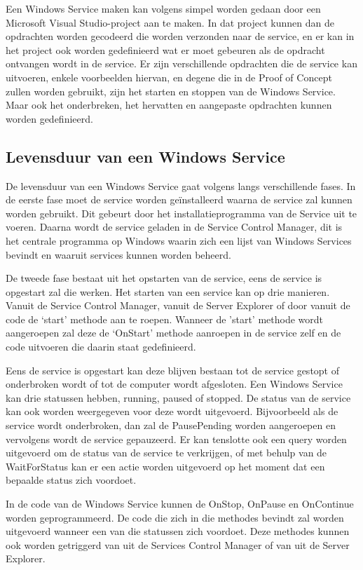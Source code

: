 Een Windows Service maken kan volgens \textcite{DevMozService} simpel worden gedaan door een Microsoft Visual Studio-project aan te maken. In dat project kunnen dan de opdrachten worden gecodeerd die worden verzonden naar de service, en er kan in het project ook worden gedefinieerd wat er moet gebeuren als de opdracht ontvangen wordt in de service. Er zijn verschillende opdrachten die de service kan uitvoeren, enkele voorbeelden hiervan, en degene die in de Proof of Concept zullen worden gebruikt, zijn het starten en stoppen van de Windows Service. Maar ook het onderbreken, het hervatten en aangepaste opdrachten kunnen worden gedefinieerd. 

\subsection{Levensduur van een Windows Service}
De levensduur van een Windows Service gaat volgens \textcite{DevMozService} langs verschillende fases. In de eerste fase moet de service worden geïnstalleerd waarna de service zal kunnen worden gebruikt. Dit gebeurt door het installatieprogramma van de Service uit te voeren. Daarna wordt de service geladen in de Service Control Manager, dit is het centrale programma op Windows waarin zich een lijst van Windows Services bevindt en waaruit services kunnen worden beheerd. 

De tweede fase bestaat uit het opstarten van de service, eens de service is opgestart zal die werken. Het starten van een service kan op drie manieren. Vanuit de Service Control Manager, vanuit de Server Explorer of door vanuit de code de ‘start’ methode aan te roepen. Wanneer de 'start’ methode wordt aangeroepen zal deze de ‘OnStart’ methode aanroepen in de service zelf en de code uitvoeren die daarin staat gedefinieerd. 

Eens de service is opgestart kan deze blijven bestaan tot de service gestopt of onderbroken wordt of tot de computer wordt afgesloten. Een Windows Service kan drie statussen hebben, running, paused of stopped. De status van de service kan ook worden weergegeven voor deze wordt uitgevoerd. Bijvoorbeeld als de service wordt onderbroken, dan zal de PausePending worden aangeroepen en vervolgens wordt de service gepauzeerd. Er kan tenslotte ook een query worden uitgevoerd om de status van de service te verkrijgen, of met behulp van de WaitForStatus kan er een actie worden uitgevoerd op het moment dat een bepaalde status zich voordoet. 

In de code van de Windows Service kunnen de OnStop, OnPause en OnContinue worden geprogrammeerd. De code die zich in die methodes bevindt zal worden uitgevoerd wanneer een van die statussen zich voordoet. Deze methodes kunnen ook worden getriggerd van uit de Services Control Manager of van uit de Server Explorer.

